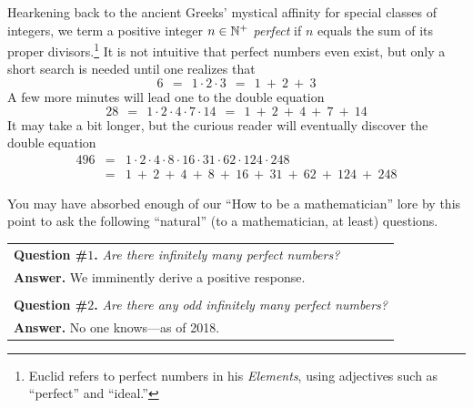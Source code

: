Hearkening back to the ancient Greeks' mystical affinity for special
classes of integers, we term a positive integer $n \in \mathbb{N}^+$ {\it
  perfect} 
if $n$ equals the sum of its proper divisors.\footnote{Euclid refers
  to perfect numbers in his {\it Elements}, using adjectives such as
  ``perfect'' and ``ideal.''}  
It is not intuitive that perfect numbers even exist, but only a short
search is needed until one realizes that
\[ 6 \ \ = \ \ 1 \cdot 2 \cdot 3 \ \ = \ \ 1 \ +\ 2 \ + \ 3 \]
A few more minutes will lead one to the double equation
\[ 28  \ \ = \ \ 1 \cdot 2 \cdot 4 \cdot 7 \cdot 14
  \ \ = \ \ 1 \ + \ 2 \ + \ 4 \ + \ 7\ + \ 14 \]
It may take a bit longer, but the curious reader will eventually
discover the double equation
\begin{eqnarray*}
496 & = & 
1 \cdot 2 \cdot 4 \cdot 8 \cdot 16 \cdot 31 \cdot 62 \cdot 124 \cdot
248 \\
 & = &
1 \ + \ 2 \ + \ 4 \ + \ 8 \ + \ 16 \ + \ 31 \ + \ 62 \ + \ 124 \ + \ 248
\end{eqnarray*}

You may have absorbed enough of our ``How to be a mathematician'' lore
by this point to ask the following ``natural'' (to a mathematician, at
least) questions.

\smallskip

\begin{tabular}{l}
{\bf Question \#$1$.}  {\em Are there {\em infinitely many} perfect numbers?} \\
{\bf Answer.}  We imminently derive a positive response. \\
 \\
{\bf Question \#$2$.}  {\em Are there any {\em odd} infinitely many perfect numbers?} \\
{\bf Answer.}  No one knows---as of 2018.
\end{tabular}

\bigskip

